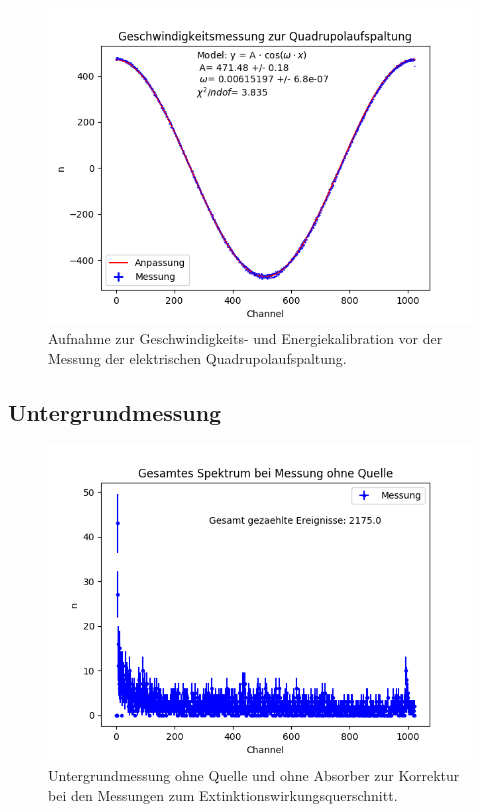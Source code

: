 \documentclass[12pt,a4paper]{article}
\begin{document}
\begin{figure} [H]
\centering
\includegraphics[scale=0.8]{Bilder/Kalibration/Quadrupol.png}
\caption{Aufnahme zur Geschwindigkeits- und Energiekalibration vor der Messung der elektrischen Quadrupolaufspaltung.}
\end{figure}

\subsection{Untergrundmessung}
\begin{figure} [H]
\centering
\includegraphics[scale=0.8]{Bilder/Extinktion/Rauschmessung.png}
\caption{Untergrundmessung ohne Quelle und ohne Absorber zur Korrektur bei den Messungen zum Extinktionswirkungsquerschnitt.}
\end{figure}
\end{document}
